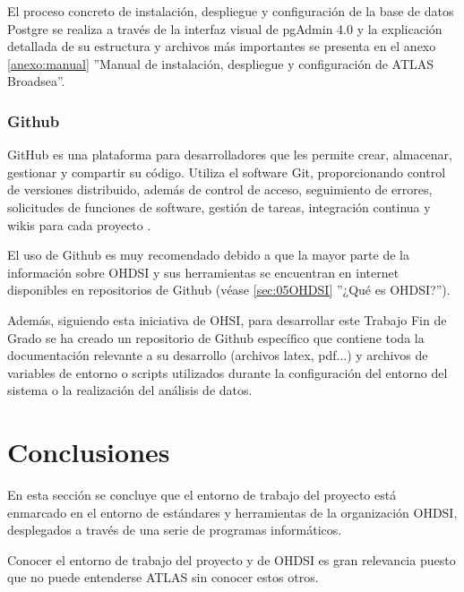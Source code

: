 El proceso concreto de instalación, despliegue y configuración de la base de datos Postgre se realiza a través de la interfaz visual de pgAdmin 4.0 \cite{pgAdminWebsite} y la explicación detallada de su estructura y archivos más importantes se presenta en el anexo \ref{anexo:manual} ''Manual de instalación, despliegue y configuración de ATLAS Broadsea''.

\subsubsection{Github}

GitHub es una plataforma para desarrolladores que les permite crear, almacenar, gestionar y compartir su código. Utiliza el software Git, proporcionando control de versiones distribuido, además de control de acceso, seguimiento de errores, solicitudes de funciones de software, gestión de tareas, integración continua y wikis para cada proyecto \cite{GithubWikipedia}.

El uso de Github es muy recomendado debido a que la mayor parte de la información sobre OHDSI y sus herramientas se encuentran en internet disponibles en repositorios de Github (véase \ref{sec:05OHDSI} ''¿Qué es OHDSI?''). 

Además, siguiendo esta iniciativa de OHSI, para desarrollar este Trabajo Fin de Grado se ha creado un repositorio de Github específico \cite{vallealonsodc} que contiene toda la documentación relevante a su desarrollo (archivos latex, pdf...) y archivos de variables de entorno o scripts utilizados durante la configuración del entorno del sistema o la realización del análisis de datos.   


\section{Conclusiones} \label{sec:07conclusiones}

En esta sección se concluye que el entorno de trabajo del proyecto está enmarcado en el entorno de estándares y herramientas de la organización OHDSI, desplegados a través de una serie de programas informáticos. 

Conocer el entorno de trabajo del proyecto y de OHDSI es gran relevancia puesto que no puede entenderse ATLAS sin conocer estos otros. 
